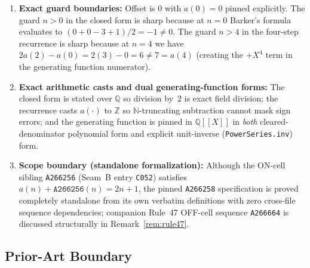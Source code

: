 \documentclass[11pt]{article}
\newcommand{\llbracket}{[\![}
\newcommand{\rrbracket}{]\!]}
\theoremstyle{definition}
\newcommand{\N}{\mathbb{N}}
\newcommand{\Z}{\mathbb{Z}}
\newcommand{\Q}{\mathbb{Q}}
\newcommand{\seq}[1]{\texttt{#1}}
\begin{document}
\begin{enumerate}
\item \textbf{Exact guard boundaries:} Offset is $0$ with $a(0) = 0$ pinned explicitly. The guard $n > 0$ in the closed form is sharp because at $n = 0$ Barker's formula evaluates to $(0 + 0 - 3 + 1)/2 = -1 \ne 0$. The guard $n > 4$ in the four-step recurrence is sharp because at $n = 4$ we have $2a(2) - a(0) = 2(3) - 0 = 6 \ne 7 = a(4)$ (creating the $+X^4$ term in the generating function numerator).
\item \textbf{Exact arithmetic casts and dual generating-function forms:} The closed form is stated over $\Q$ so division by~$2$ is exact field division; the recurrence casts $a(\cdot)$ to $\Z$ so $\N$-truncating subtraction cannot mask sign errors; and the generating function is pinned in $\Q\llbracket X \rrbracket$ in \emph{both} cleared-denominator polynomial form and explicit unit-inverse (\texttt{PowerSeries.inv}) form.
\item \textbf{Scope boundary (standalone formalization):} Although the ON-cell sibling \seq{A266256} (Seam~B entry \texttt{C052}) satisfies $a(n) + \seq{A266256}(n) = 2n + 1$, the pinned \seq{A266258} specification is proved completely standalone from its own verbatim definitions with zero cross-file sequence dependencies; companion Rule~47 OFF-cell sequence \seq{A266664} is discussed structurally in Remark~\ref{rem:rule47}.
\end{enumerate}

\subsection{Prior-Art Boundary}
\label{sec:prior-art}
\end{document}
